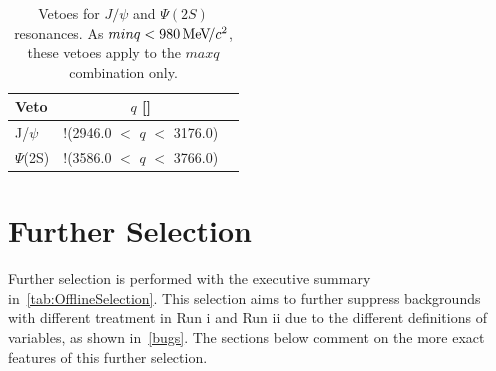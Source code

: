 \begin{table}[h!]
\begin{center}
\begin{tabular}{l c c}\toprule
	Veto & $q$ [\mevcc]  \\ \hline
        J/$\psi$  & !(2946.0 $<$ $q$ $<$ 3176.0)  \\
	$\Psi$(2S) &  !(3586.0 $<$ $q$  $<$ 3766.0)  \\
        \bottomrule
\end{tabular}
\end{center}
\caption{Vetoes for $J/\psi$ and $\Psi(2S)$ resonances. As $minq< 980 {\mathrm{\,Me\kern -0.1em V\!/}c^2}$, these vetoes apply to the $maxq$ combination only. }
\label{tab:vetoes}
\end{table}

\section{Further Selection}

Further selection is performed with the executive summary in~\autoref{tab:OfflineSelection}. This selection aims to further suppress backgrounds with different treatment in Run \Rn{1} and Run \Rn{2} due to the different definitions of variables, as shown in~\autoref{bugs}. The sections below comment on the more exact features of this further selection. 

